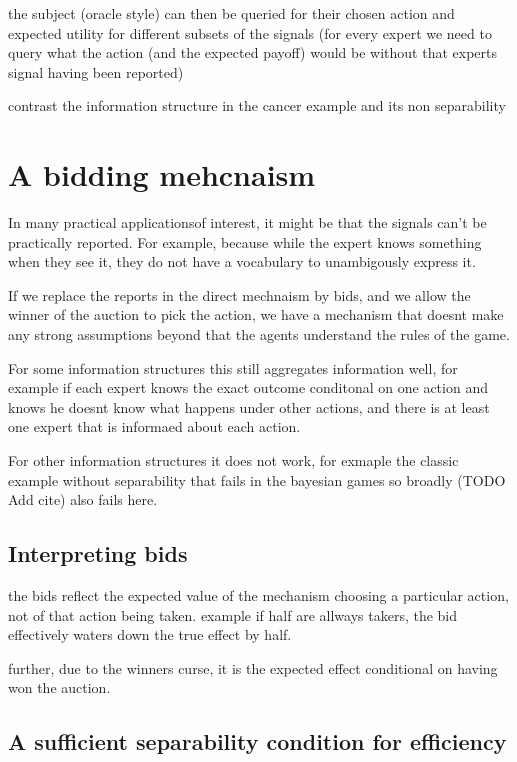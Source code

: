 the subject (oracle style) can then be queried for their chosen action and expected utility for different subsets of the signals (for every expert we need to query what the action (and the expected payoff) would be without that experts signal having been reported)

contrast the information structure in the cancer example and its non separability 


\section{A bidding mehcnaism }

In many practical applicationsof interest, it might be that the signals can't be practically reported. For example, because while the expert knows something when they see it, they do not have a vocabulary to unambigously express it. 


If we replace the reports in the direct mechnaism by bids, and we allow the winner of the auction to pick the action, we have a mechanism that doesnt make any strong assumptions beyond that the agents understand the rules of the game.

For some information structures this still aggregates information well, for example if each expert knows the exact outcome conditonal on one action and knows he doesnt know what happens under other actions, and there is at least one expert that is informaed about each action.

For other information structures it does not work, for exmaple the classic example without separability that fails in the bayesian games so broadly (TODO Add cite) also fails here. 

\subsection{Interpreting bids}

the bids reflect the expected value of the mechanism choosing a particular action, not of that action being taken. example if half are allways takers, the bid effectively waters down the true effect by half.

further, due to the winners curse, it is the expected effect conditional on having won the auction. 

\subsection{A sufficient separability condition for efficiency}

